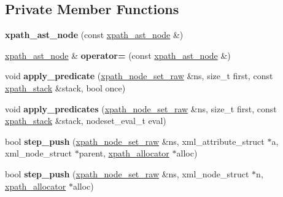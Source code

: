 \subsection*{Private Member Functions}
\begin{DoxyCompactItemize}
\item 
\mbox{\label{classxpath__ast__node_ae5a059e41b41505bef1f7dbebda8070b}} 
{\bfseries xpath\+\_\+ast\+\_\+node} (const \hyperlink{classxpath__ast__node}{xpath\+\_\+ast\+\_\+node} \&)
\item 
\mbox{\label{classxpath__ast__node_a60fddea92b095c2b8705f12f7309e6aa}} 
\hyperlink{classxpath__ast__node}{xpath\+\_\+ast\+\_\+node} \& {\bfseries operator=} (const \hyperlink{classxpath__ast__node}{xpath\+\_\+ast\+\_\+node} \&)
\item 
\mbox{\label{classxpath__ast__node_a7e35f265c9e0712a16e1d8a9db4c7672}} 
void {\bfseries apply\+\_\+predicate} (\hyperlink{classxpath__node__set__raw}{xpath\+\_\+node\+\_\+set\+\_\+raw} \&ns, size\+\_\+t first, const \hyperlink{structxpath__stack}{xpath\+\_\+stack} \&stack, bool once)
\item 
\mbox{\label{classxpath__ast__node_af025a480dab7dd0bab21157fb9dd3e73}} 
void {\bfseries apply\+\_\+predicates} (\hyperlink{classxpath__node__set__raw}{xpath\+\_\+node\+\_\+set\+\_\+raw} \&ns, size\+\_\+t first, const \hyperlink{structxpath__stack}{xpath\+\_\+stack} \&stack, nodeset\+\_\+eval\+\_\+t eval)
\item 
\mbox{\label{classxpath__ast__node_a4f7aaa038105a1d98a7505606ca2b5a2}} 
bool {\bfseries step\+\_\+push} (\hyperlink{classxpath__node__set__raw}{xpath\+\_\+node\+\_\+set\+\_\+raw} \&ns, xml\+\_\+attribute\+\_\+struct $\ast$a, xml\+\_\+node\+\_\+struct $\ast$parent, \hyperlink{classxpath__allocator}{xpath\+\_\+allocator} $\ast$alloc)
\item 
\mbox{\label{classxpath__ast__node_a29d639296f3cd2726e6967b1ba277928}} 
bool {\bfseries step\+\_\+push} (\hyperlink{classxpath__node__set__raw}{xpath\+\_\+node\+\_\+set\+\_\+raw} \&ns, xml\+\_\+node\+\_\+struct $\ast$n, \hyperlink{classxpath__allocator}{xpath\+\_\+allocator} $\ast$alloc)
\item 

\end{DoxyCompactItemize}
